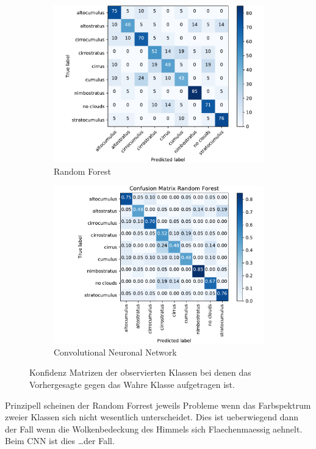 \begin{figure}[h]
		\centering
		\begin{subfigure}[b]{0.49\textwidth}
				\begin{center}
						\includegraphics[width=\textwidth]{./pictures/conf_rf.pdf}
				\end{center}
				\caption{Random Forest}
				\label{fig:conf_rf}
		\end{subfigure}
		\begin{subfigure}[b]{0.49\textwidth}
				\begin{center}
						\includegraphics[width=\textwidth]{./pictures/conf_cnn.pdf}
				\end{center}
				\caption{Convolutional Neuronal Network}
				\label{fig:conf_cnn}
		\end{subfigure}
		\caption{Konfidenz Matrizen der observierten Klassen bei denen das
		Vorhergesagte gegen das Wahre Klasse aufgetragen ist.}
		\label{fig:conf}
\end{figure}
Prinzipell scheinen der Random Forrest jeweils Probleme wenn das Farbspektrum
zweier Klassen sich nicht wesentlich unterscheidet.
Dies ist ueberwiegend dann der Fall wenn die Wolkenbedeckung des Himmels sich
Flaechenmaessig aehnelt. 
Beim CNN ist dies \ldots der Fall.

